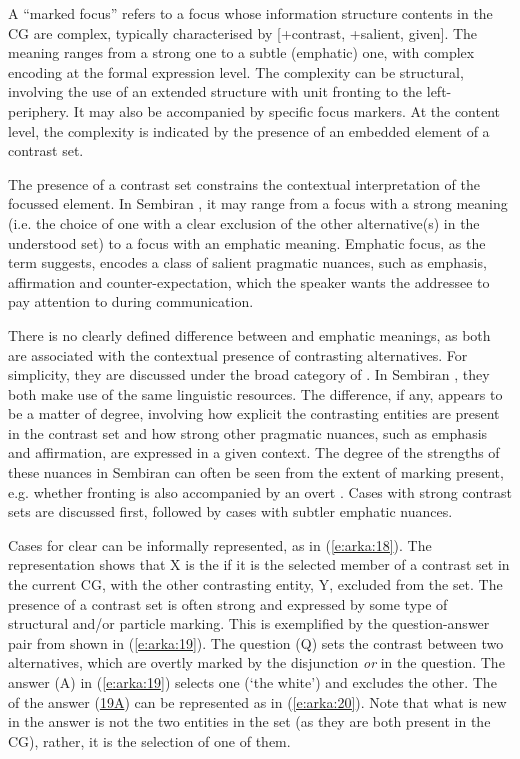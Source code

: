 \documentclass[output=paper
,modfonts
,nonflat]{langsci/langscibook}
\begin{document}
A “marked focus” refers to a focus whose information structure contents in the CG are complex, typically characterised by [+contrast, +salient, \textminus given]. The  meaning ranges from a strong one to a subtle (emphatic) one, with complex encoding at the formal expression level. The complexity can be structural, involving the use of an extended  structure with unit fronting to the left-periphery. It may also be accompanied by specific focus markers. At the content level, the complexity is indicated by the presence of an embedded element of a contrast set.

The presence of a contrast set constrains the contextual interpretation of the focussed element. In Sembiran , it may range from a focus with a strong  meaning (i.e. the choice of one with a clear exclusion of the other alternative(s) in the understood set) to a focus with an emphatic meaning. Emphatic focus, as the term suggests, encodes a class of salient pragmatic nuances, such as emphasis, affirmation and counter-expectation, which the speaker wants the addressee to pay attention to during communication. 

There is no clearly defined difference between  and emphatic meanings, as both are associated with the contextual presence of contrasting alternatives. For simplicity, they are discussed under the broad category of . In Sembiran , they both make use of the same linguistic resources. The difference, if any, appears to be a matter of degree, involving how explicit the contrasting entities are present in the contrast set and how strong other pragmatic nuances, such as emphasis and affirmation, are expressed in a given context. The degree of the strengths of these nuances in Sembiran  can often be seen from the extent of marking present, e.g. whether fronting is also accompanied by an overt . Cases with strong contrast sets are discussed first, followed by cases with subtler emphatic nuances. 

Cases for clear  can be informally represented, as in (\ref{e:arka:18}). The representation shows that X is the  if it is the selected member of a contrast set in the current CG, with the other contrasting entity, Y, excluded from the set. The presence of a contrast set is often strong and expressed by some type of structural and/or particle marking. This is exemplified by the question-answer pair from  shown in (\ref{e:arka:19}). The question (Q) sets the contrast between two alternatives, which are overtly marked by the disjunction \textit{or} in the question. The answer (A) in (\ref{e:arka:19}) selects one (‘the white’) and excludes the other. The  of the answer (\hyperref[e:arka:19a]{19A}) can be represented as in (\ref{e:arka:20}). Note that what is new in the answer is not the two entities in the set (as they are both present in the CG), rather, it is the selection of one of them.
\end{document}
